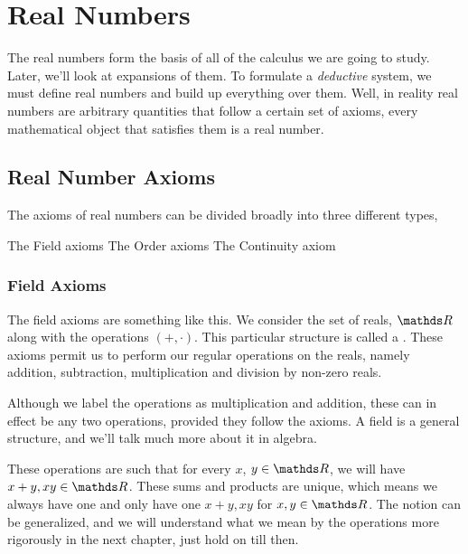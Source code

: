 \chapter{Real Numbers}


The real numbers form the basis of all of the calculus we are going to study. Later, we'll look at expansions of them.
To formulate a \emph{deductive} system, we must define real numbers and build up everything over them. Well, in reality
real numbers are arbitrary quantities that follow a certain set of axioms, every mathematical object that satisfies
them is a real number.

\section{Real Number Axioms}

The axioms of real numbers can be divided broadly into three different types,

\begin{itemize}
    \ii The Field axioms
    \ii The Order axioms
    \ii The Continuity axiom
\end{itemize}

\subsection{Field Axioms}

The field axioms are something like this. We consider the set of reals, \(\RR\)
along with the operations \((+, \cdot)\). This particular structure is called a 
. These axioms permit us to perform our regular operations on 
the reals, namely addition, subtraction, multiplication and division by non-zero
reals.

Although we label the operations as multiplication and addition, these can in effect be 
any two operations, provided they follow the axioms. A field is a general structure, 
and we'll talk much more about it in algebra.

These operations are such that for every \(x\), \(y \in \RR\), we will have \(x + y, xy \in \RR\). 
These sums and products are unique, which means we always have one and only have one 
\(x+y, xy\) for \(x, y \in \RR\). The notion can be generalized, and we will understand what we mean by 
the operations more rigorously in the next chapter, just hold on till then.

